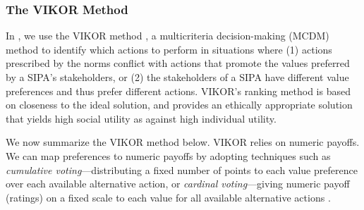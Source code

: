 \subsubsection{The VIKOR Method}


In \frameworkAinur, we use the VIKOR
method \citep{opricovic2004compromise}, a multicriteria decision-making (MCDM) method to identify which
actions to perform in situations where (1) actions prescribed by the norms
conflict with actions that promote the values preferred by a SIPA's
stakeholders, or (2) the stakeholders of a SIPA have different value
preferences and thus prefer different actions.
VIKOR's ranking method is based on closeness to the ideal solution, and provides an ethically appropriate solution that yields high social utility as against high individual utility.

We now summarize the VIKOR method  \citep{opricovic2004compromise} below. 
VIKOR relies on numeric payoffs. 
We can map preferences to numeric payoffs by adopting techniques such as \emph{cumulative voting}---distributing a fixed number of points to each value preference over each available alternative action, or \emph{cardinal voting}---giving numeric payoff (ratings) on a fixed scale to each value for all available alternative actions \citep{pacuit-voting-methods}. 

